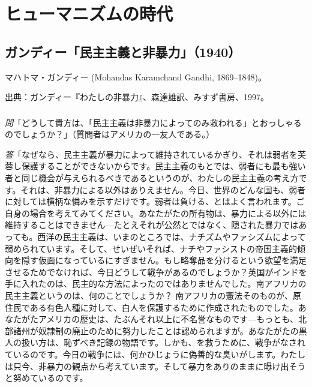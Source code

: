 
\chapter{ヒューマニズムの時代}



\section{ガンディー「民主主義と非暴力」（1940）}


マハトマ・ガンディー (Mohandas Karamchand Gandhi, 1869--1848)。

出典：ガンディー『わたしの非暴力』、森達雄訳、みすず書房、1997。

\subsection{}


\emph{問}「どうして貴方は、「民主主義は非暴力によってのみ救われる」とおっしゃるのでしょうか？」（質問者はアメリカの一友人である。）



\emph{答}「なぜなら、民主主義が暴力によって維持されているかぎり、それは弱者を芙蓉し保護することができないからです。民主主義のもとでは、弱者にも最も強い者と同じ機会が与えられるべきであるというのが、わたしの民主主義の考え方です。それは、非暴力による以外はありえません。今日、世界のどんな国も、弱者に対しては横柄な憐みを示すだけです。弱者は負ける、とはよく言われます。ご自身の場合を考えてみてください。あなたがたの所有物は、暴力による以外には維持することはできません{\——}たとえそれが公然とではなく、隠された暴力ではあっても。西洋の民主主義は、いまのところでは、ナチズムやファシズムによって弱められています。そして、せいぜいそれば、ナチやファシストの帝国主義的傾向を隠す仮面になっているにすぎません。もし略奪品を分けるという欲望を満足させるためでなければ、今日どうして戦争があるのでしょうか？英国がインドを手に入れたのは、民主的な方法によったのではありませんでした。南アフリカの民主主義というのは、何のことでしょうか？ 南アフリカの憲法そのものが、原住民である有色人種に対して、白人を保護するために作成されたものでした。あなたがたアメリカの歴史は、たぶんそれ以上に不名誉なものです{\——}もっとも、北部諸州が奴隷制の廃止のために努力したことは認められますが。あなたがたの黒人の扱い方は、恥ずべき記録の物語です。しかも、を救うために、戦争がなされているのです。今日の戦争には、何かひじょうに偽善的な臭いがします。わたしは只今、非暴力の観点から考えています。そして暴力をありのままに曝け出そうと努めているのです。

